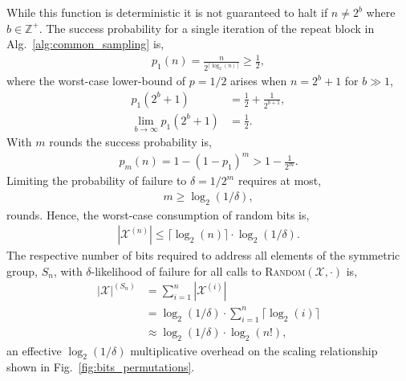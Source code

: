 While this function is deterministic it is not guaranteed to halt if $n\neq 2^b$ where $b\in\mathbb{Z}^+$. The success probability for a single iteration of the repeat block in Alg.~\ref{alg:common_sampling} is,
\begin{align}
	p_1(n) = \frac{n}{2^{\lceil \log_2(n) \rceil}} \geq \frac{1}{2},
\end{align}
where the worst-case lower-bound of $p=1/2$ arises when \mbox{$n=2^b+1$} for \mbox{$b\gg 1$},
\begin{align}
	p_1(2^b+1)                   & = \frac{1}{2} + \frac{1}{2^{b+1}},\nonumber \\
	\lim_{b\to\infty} p_1(2^b+1) & = \frac{1}{2}.
\end{align}
With $m$ rounds the success probability is,
\begin{align}
	p_m(n) = 1-(1-p_1)^m > 1-\frac{1}{2^m}.
\end{align}
Limiting the probability of failure to $\delta=1/2^m$ requires at most,
\begin{align}
	m \geq \log_2(1/\delta),
\end{align}
rounds. Hence, the worst-case consumption of random bits is,
\begin{align}
	|\mathcal{X}^{(n)}| \leq \lceil \log_2(n) \rceil \cdot \log_2(1/\delta).
\end{align}
The respective number of bits required to address all elements of the symmetric group, $S_n$, with $\delta$-likelihood of failure for all calls to \textsc{Random}$(\mathcal{X},\cdot)$ is,
\begin{align}
	|\mathcal{X}|^{(S_n)} & = \sum_{i=1}^n |\mathcal{X}^{(i)}| \nonumber                          \\
	                      & = \log_2(1/\delta) \cdot \sum_{i=1}^n \lceil\log_2(i)\rceil \nonumber \\
	                      & \approx \log_2(1/\delta) \cdot \log_2(n!),
\end{align}
an effective $\log_2(1/\delta)$ multiplicative overhead on the scaling relationship shown in Fig.~\ref{fig:bits_permutations}.

